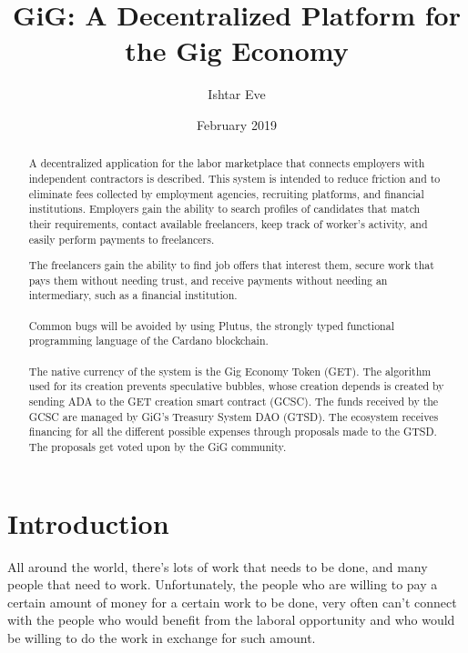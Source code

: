 \documentclass{article}
\title{GiG: A Decentralized Platform for the Gig Economy}
\author{Ishtar Eve}
\date{February 2019}
\begin{document}
   \maketitle
   \begin{abstract}
A decentralized application for the labor marketplace that connects employers with independent contractors is described. This system is intended to reduce friction and to eliminate fees collected by employment agencies, recruiting platforms, and financial institutions. Employers gain the ability to search profiles of candidates that match their requirements, contact available freelancers, keep track of worker's activity, and easily perform payments to freelancers.

The freelancers gain the ability to find job offers that interest them, secure work that pays them without needing trust, and receive payments without needing an intermediary, such as a financial institution.


\paragraph{} Common bugs will be avoided by using Plutus, the strongly typed functional programming language of the Cardano blockchain.

\paragraph{} The native currency of the system is the Gig Economy Token (GET). The algorithm used for its creation prevents speculative bubbles, whose creation depends  is created by sending ADA to the GET creation smart contract (GCSC). The funds received by the GCSC are managed by GiG's Treasury System DAO (GTSD).
The ecosystem receives financing for all the different possible expenses through proposals made to the GTSD. The proposals get voted upon by the GiG community.
\end{abstract}

\section{Introduction}   
All around the world, there's lots of work that needs to be done, and many people that need to work. Unfortunately, the people who are willing to pay a certain amount of money for a certain work to be done, very often can't connect with the people who would benefit from the laboral opportunity and who would be willing to do the work in exchange for such amount.
\end{document}
